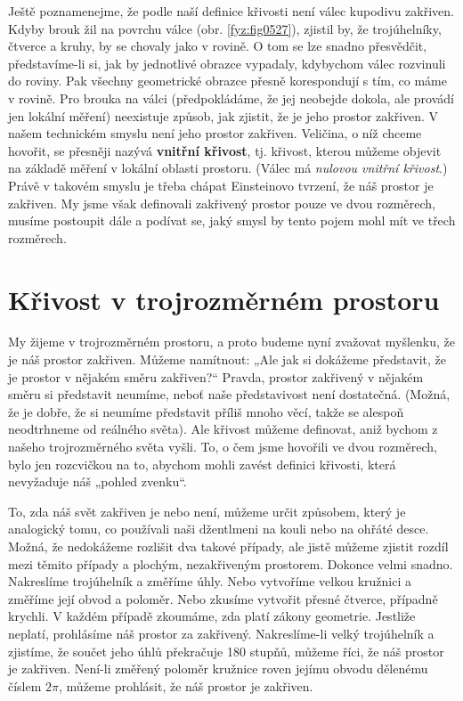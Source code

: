     Ještě poznamenejme, že podle naší definice křivosti není válec kupodivu zakřiven. Kdyby brouk 
    žil na povrchu válce (obr. \ref{fyz:fig0527}), zjistil by, že trojúhelníky, čtverce a kruhy, by 
    se chovaly jako v rovině. O tom se lze snadno přesvědčit, představíme-li si, jak by jednotlivé 
    obrazce vypadaly, kdybychom válec rozvinuli do roviny. Pak všechny geometrické obrazce přesně 
    korespondují s tím, co máme v rovině. Pro brouka na válci (předpokládáme, že jej neobejde 
    dokola, ale provádí jen lokální měření) neexistuje způsob, jak zjistit, že je jeho prostor 
    zakřiven. V našem technickém smyslu není jeho prostor zakřiven. Veličina, o níž chceme hovořit, 
    se přesněji nazývá \textbf{vnitřní křivost}, tj. křivost, kterou můžeme objevit na základě 
    měření v lokální oblasti prostoru. (Válec má \emph{nulovou vnitřní křivost}.) Právě v takovém 
    smyslu je třeba chápat Einsteinovo tvrzení, že náš prostor je zakřiven. My jsme však definovali 
    zakřivený prostor pouze ve dvou rozměrech, musíme postoupit dále a podívat se, jaký smysl by 
    tento pojem mohl mít ve třech rozměrech.
    
  \section{Křivost v trojrozměrném prostoru}\label{fyz:IIchapXLIIsecII}
    My žijeme v trojrozměrném prostoru, a proto budeme nyní zvažovat myšlenku, že je náš prostor 
    zakřiven. Můžeme namítnout: „Ale jak si dokážeme představit, že je prostor v nějakém směru 
    zakřiven?“ Pravda, prostor zakřivený v nějakém směru si představit neumíme, neboť naše 
    představivost není dostatečná. (Možná, že je dobře, že si neumíme představit příliš mnoho věcí, 
    takže se alespoň neodtrhneme od reálného světa). Ale křivost můžeme definovat, aniž bychom z 
    našeho trojrozměrného světa vyšli. To, o čem jsme hovořili ve dvou rozměrech, bylo jen 
    rozcvičkou na to, abychom mohli zavést definici křivosti, která nevyžaduje náš „pohled zvenku“.
    
    To, zda náš svět zakřiven je nebo není, můžeme určit způsobem, který je analogický tomu, co 
    používali naši džentlmeni na kouli nebo na ohřáté desce. Možná, že nedokážeme rozlišit dva 
    takové případy, ale jistě můžeme zjistit rozdíl mezi těmito případy a plochým, nezakřiveným 
    prostorem. Dokonce velmi snadno. Nakreslíme trojúhelník a změříme úhly. Nebo vytvoříme velkou 
    kružnici a změříme její obvod a poloměr. Nebo zkusíme vytvořit přesné čtverce, případně 
    krychli. V každém případě zkoumáme, zda platí zákony geometrie. Jestliže neplatí, prohlásíme 
    náš prostor za zakřivený. Nakreslíme-li velký trojúhelník a zjistíme, že součet jeho úhlů 
    překračuje \num{180} stupňů, můžeme říci, že náš prostor je zakřiven. Není-li změřený poloměr 
    kružnice roven jejímu obvodu dělenému číslem \(2\pi\), můžeme prohlásit, že náš prostor je 
    zakřiven.
    

